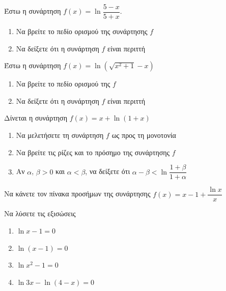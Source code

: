 \documentclass{presentation}
\begin{document}
\begin{askisi}
  Έστω η συνάρτηση $f(x)=\ln \dfrac{5-x}{5+x}$.
  \begin{enumerate}
    \item<1-> Να βρείτε το πεδίο ορισμού της συνάρτησης $f$
    \item<2-> Να δείξετε ότι η συνάρτηση $f$ είναι περιττή
  \end{enumerate}


\end{askisi}

\begin{askisi}
  Έστω η συνάρτηση $f(x)=\ln \left( \sqrt{x^2+1}-x \right) $
  \begin{enumerate}
    \item<1-> Να βρείτε το πεδίο ορισμού της $f$
    \item<2-> Να δείξετε ότι η συνάρτηση $f$ είναι περιττή
  \end{enumerate}


\end{askisi}

\begin{askisi}
  Δίνεται η συνάρτηση $f(x)=x+\ln(1+x)$
  \begin{enumerate}
    \item<1-> Να μελετήσετε τη συνάρτηση $f$ ως προς τη μονοτονία
    \item<2-> Να βρείτε τις ρίζες και το πρόσημο της συνάρτησης $f$
    \item<3-> Αν $α$, $β>0$ και $α<β$, να δείξετε ότι $α-β<\ln \dfrac{1+β}{1+α}$
  \end{enumerate}


\end{askisi}

\begin{askisi}
  Να κάνετε τον πίνακα προσήμων της συνάρτησης $f(x)=x-1+\dfrac{\ln x}{x}$


\end{askisi}

\begin{askisi}
  Να λύσετε τις εξισώσεις
  \begin{enumerate}
    \item<1-> $\ln x-1=0$
    \item<2-> $\ln (x-1)=0$
    \item<3-> $\ln x^2-1=0$
    \item<4-> $\ln 3x-\ln(4-x)=0$
  \end{enumerate}


\end{askisi}
\end{document}
